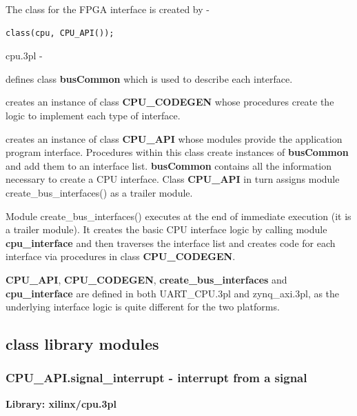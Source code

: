     The class for the FPGA interface is created by -
    
    \begin{lstlisting}[gobble=4, language=threepl]
    class(cpu, CPU_API());
    \end{lstlisting}

    cpu.3pl -
    \blist   
    \item   defines class {\bf busCommon} which is used to describe each
            interface.    
    \item   creates an instance of class {\bf CPU\_CODEGEN} whose procedures
            create the logic to implement each type of interface.        
    \item   creates an instance of class {\bf CPU\_API} whose modules
            provide the application program interface. Procedures within
            this class create instances of {\bf busCommon} and add them to
            an interface list. {\bf busCommon} contains all the information
            necessary to create a CPU interface. Class {\bf CPU\_API} in
            turn assigns module create\_bus\_interfaces() as a trailer
            module.
    \blend
    
    Module create\_bus\_interfaces() executes at the end of immediate execution
    (it is a trailer module). It creates the basic CPU interface logic by
    calling module {\bf cpu\_interface} and then traverses the interface list
    and creates code for each interface via procedures in class {\bf
    CPU\_CODEGEN}.
    
    {\bf CPU\_API}, {\bf CPU\_CODEGEN}, {\bf create\_bus\_interfaces} and
    {\bf cpu\_interface} are defined in both UART\_CPU.3pl and zynq\_axi.3pl,
    as the underlying interface logic is quite different for the two platforms.






    \subsection{class library modules}
            
                
        \subsubsection{CPU\_API.signal\_interrupt - interrupt from a signal}\label{sec:lpcpusigint}

            {\bf Library: xilinx/cpu.3pl}

